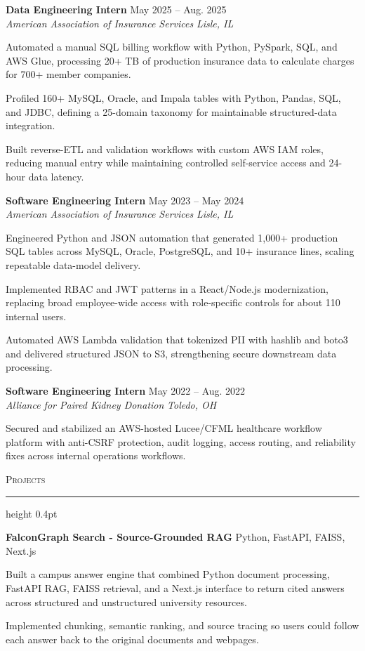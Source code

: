 \documentclass[letterpaper,11pt]{article}
\newcommand{\resumesection}[1]{%
  \par\vspace{2pt}%
  {\large\scshape #1}\par\vspace{2pt}%
  \hrule height 0.4pt\vspace{2pt}%
}
\newcommand{\resumeSubheading}[4]{
  \textbf{#1} \hfill #2\\
  \textit{#3} \hfill \textit{#4}
}
\newcommand{\projectHeading}[2]{
  \textbf{#1} \hfill #2
}
\begin{document}
\resumeSubheading
{Data Engineering Intern}{May 2025 -- Aug. 2025}
{American Association of Insurance Services}{Lisle, IL}
\begin{tightitemize}
  \item Automated a manual SQL billing workflow with Python, PySpark, SQL, and AWS Glue, processing 20+ TB of production insurance data to calculate charges for 700+ member companies.
  \item Profiled 160+ MySQL, Oracle, and Impala tables with Python, Pandas, SQL, and JDBC, defining a 25-domain taxonomy for maintainable structured-data integration.
  \item Built reverse-ETL and validation workflows with custom AWS IAM roles, reducing manual entry while maintaining controlled self-service access and 24-hour data latency.
\end{tightitemize}

\resumeSubheading
{Software Engineering Intern}{May 2023 -- May 2024}
{American Association of Insurance Services}{Lisle, IL}
\begin{tightitemize}
\item Engineered Python and JSON automation that generated 1,000+ production SQL tables across MySQL, Oracle, PostgreSQL, and 10+ insurance lines, scaling repeatable data-model delivery.
  \item Implemented RBAC and JWT patterns in a React/Node.js modernization, replacing broad employee-wide access with role-specific controls for about 110 internal users.
  \item Automated AWS Lambda validation that tokenized PII with hashlib and boto3 and delivered structured JSON to S3, strengthening secure downstream data processing.
\end{tightitemize}

\resumeSubheading
{Software Engineering Intern}{May 2022 -- Aug. 2022}
{Alliance for Paired Kidney Donation}{Toledo, OH}
\begin{tightitemize}
  \item Secured and stabilized an AWS-hosted Lucee/CFML healthcare workflow platform with anti-CSRF protection, audit logging, access routing, and reliability fixes across internal operations workflows.
\end{tightitemize}

\resumesection{Projects}
\projectHeading{FalconGraph Search - Source-Grounded RAG}{Python, FastAPI, FAISS, Next.js}
\begin{tightitemize}
  \item Built a campus answer engine that combined Python document processing, FastAPI RAG, FAISS retrieval, and a Next.js interface to return cited answers across structured and unstructured university resources.
  \item Implemented chunking, semantic ranking, and source tracing so users could follow each answer back to the original documents and webpages.
\end{tightitemize}
\end{document}
